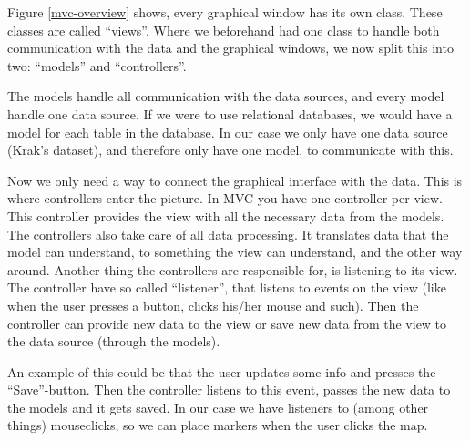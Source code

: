 Figure \ref{mvc-overview} shows, every graphical window has its own class. These
classes are called ``views''. Where we beforehand had one class to handle both
communication with the data and the graphical windows, we now split this into
two: ``models'' and ``controllers''.

The models handle all communication with the data sources, and every model
handle one data source. If we were to use relational databases, we would have a
model for each table in the database. In our case we only have one data source
(Krak's dataset), and therefore only have one model, to communicate with this.

Now we only need a way to connect the graphical interface with the data. This is
where controllers enter the picture. In MVC you have one controller per view.
This controller provides the view with all the necessary data from the models. 
The controllers also take care of all data processing. It translates data that the 
model can understand, to something the view can understand, and the other 
way around. Another thing the controllers are responsible for, is listening to its view. 
The controller have so called ``listener'', that listens to events on the view (like when 
the user presses a button, clicks his/her mouse and such). Then the controller can 
provide new data to the view or save new data from the view to the data source 
(through the models).

An example of this could be that the user updates some info and presses the 
``Save''-button. Then the controller listens to this event, passes the new data
to the models and it gets saved.
In our case we have listeners to (among other things) mouseclicks, so we can
place markers when the user clicks the map.
